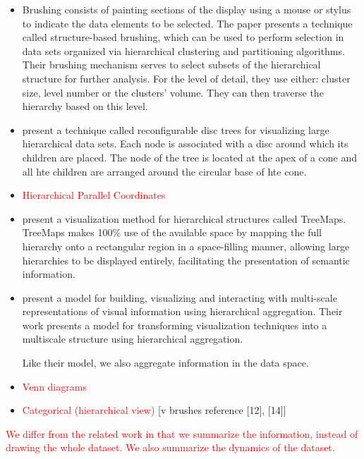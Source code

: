 \begin{itemize}
	\item \cite{Fua:2000:SBM:614278.614457} Brushing consists of painting sections of the display using a 
	mouse or stylus to indicate the data elements to be selected. The paper presents a technique called
	structure-based brushing, which can be used to perform selection in data sets organized via hierarchical clustering
	and partitioning algorithms. Their brushing mechanism serves to select subsets of the hierarchical structure
	for further analysis. For the level of detail, they use either: cluster size, level number or the clusters' volume.
	They can then traverse the hierarchy based on this level.
	
	\item \cite{729555} present a technique called
	reconfigurable disc trees for visualizing large hierarchical data sets. Each node is associated with a disc around which 
	its children are placed. The node of the tree is located at the apex of a cone and all hte children are arranged around
	the circular base of hte cone.
	
	\item \textcolor{red}{Hierarchical Parallel Coordinates}
	
	\item \cite{Johnson:1991:TSA:949607.949654} present a visualization method for hierarchical structures called TreeMaps.
	TreeMaps makes 100\% use of the available space by mapping the full hierarchy onto a rectangular region in a space-filling
	manner, allowing large hierarchies to be displayed entirely, facilitating the presentation of semantic information.

	\item \cite{Elmqvist:2010:HAI:1749404.1749525}
	present a model for building, visualizing and interacting with multi-scale representations of visual information
	using hierarchical aggregation. Their work presents a model for transforming visualization techniques into a multiscale
	structure using hierarchical aggregation.
	
	Like their model, we also aggregate information in the data space.
	
	\item \textcolor{red}{Venn diagrams}
	
	\item \textcolor{red}{Categorical (hierarchical view)} [v brushes reference [12], [14]]
\end{itemize}

\textcolor{red}{We differ from the related work in that we summarize the information, instead of drawing the whole
dataset. We also summarize the dynamics of the dataset.}
